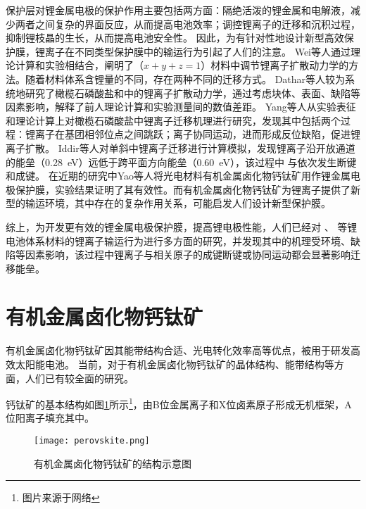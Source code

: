 保护层对锂金属电极的保护作用主要包括两方面：隔绝活泼的锂金属和电解液，减少两者之间复杂的界面反应，从而提高电池效率；调控锂离子的迁移和沉积过程，抑制锂枝晶的生长，从而提高电池安全性。
因此，为有针对性地设计新型高效保护膜，锂离子在不同类型保护膜中的输运行为引起了人们的注意。
Wei等人通过理论计算和实验相结合，阐明了（$x+y+z=1$）材料中调节锂离子扩散动力学的方法。随着材料体系含锂量的不同，存在两种不同的迁移方式。
Dathar等人较为系统地研究了橄榄石磷酸盐和中的锂离子扩散动力学，通过考虑块体、表面、缺陷等因素影响，解释了前人理论计算和实验测量间的数值差距。
Yang等人从实验表征和理论计算上对橄榄石磷酸盐中锂离子迁移机理进行研究，发现其中包括两个过程：锂离子在基团相邻位点之间跳跃；离子协同运动，进而形成反位缺陷，促进锂离子扩散。
Iddir等人对单斜中锂离子迁移进行计算模拟，发现锂离子沿开放通道的能垒（\SI{0.28} {eV}）远低于跨平面方向能垒（\SI{0.60}{eV}），该过程中  与依次发生断键和成键。
在近期的研究中Yao等人将光电材料有机金属卤化物钙钛矿用作锂金属电极保护膜，实验结果证明了其有效性。而有机金属卤化物钙钛矿为锂离子提供了新型的输运环境，其中存在的复杂作用关系，可能启发人们设计新型保护膜。

综上，为开发更有效的锂金属电极保护膜，提高锂电极性能，人们已经对  、 等锂电池体系材料的锂离子输运行为进行多方面的研究，并发现其中的机理受环境、缺陷等因素影响，该过程中锂离子与相关原子的成键断键或协同运动都会显著影响迁移能垒。

\section{有机金属卤化物钙钛矿}

有机金属卤化物钙钛矿因其能带结构合适、光电转化效率高等优点，被用于研发高效太阳能电池。
当前，对于有机金属卤化物钙钛矿的晶体结构、能带结构等方面，人们已有较全面的研究。

钙钛矿的基本结构如图\ref{fig:perovskite}所示\footnote{图片来源于网络}，由B位金属离子和X位卤素原子形成无机框架，A位阳离子填充其中。

\begin{figure}[htbp]
    \centering
    \texttt{[image: perovskite.png]}
    \caption{有机金属卤化物钙钛矿的结构示意图}
    \label{fig:perovskite}
\end{figure}

